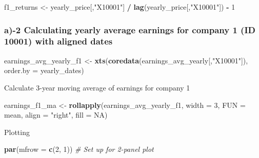 \documentclass[
]{article}
\newenvironment{Shaded}{\begin{snugshade}}{\end{snugshade}}
\newcommand{\AttributeTok}[1]{\textcolor[rgb]{0.13,0.29,0.53}{#1}}
\newcommand{\CommentTok}[1]{\textcolor[rgb]{0.56,0.35,0.01}{\textit{#1}}}
\newcommand{\ConstantTok}[1]{\textcolor[rgb]{0.56,0.35,0.01}{#1}}
\newcommand{\DecValTok}[1]{\textcolor[rgb]{0.00,0.00,0.81}{#1}}
\newcommand{\FunctionTok}[1]{\textcolor[rgb]{0.13,0.29,0.53}{\textbf{#1}}}
\newcommand{\NormalTok}[1]{#1}
\newcommand{\OtherTok}[1]{\textcolor[rgb]{0.56,0.35,0.01}{#1}}
\newcommand{\SpecialCharTok}[1]{\textcolor[rgb]{0.81,0.36,0.00}{\textbf{#1}}}
\newcommand{\StringTok}[1]{\textcolor[rgb]{0.31,0.60,0.02}{#1}}
\begin{document}
\begin{Shaded}
\begin{Highlighting}[]
\NormalTok{f1\_returns }\OtherTok{\textless{}{-}}\NormalTok{ yearly\_price[,}\StringTok{"X10001"}\NormalTok{] }\SpecialCharTok{/} \FunctionTok{lag}\NormalTok{(yearly\_price[,}\StringTok{"X10001"}\NormalTok{]) }\SpecialCharTok{{-}} \DecValTok{1}
\end{Highlighting}
\end{Shaded}

\subsubsection{a)-2 Calculating yearly average earnings for company 1
(ID 10001) with aligned
dates}\label{a-2-calculating-yearly-average-earnings-for-company-1-id-10001-with-aligned-dates}

\begin{Shaded}
\begin{Highlighting}[]
\NormalTok{earnings\_avg\_yearly\_f1 }\OtherTok{\textless{}{-}} \FunctionTok{xts}\NormalTok{(}\FunctionTok{coredata}\NormalTok{(earnings\_avg\_yearly[,}\StringTok{"X10001"}\NormalTok{]), }\AttributeTok{order.by =}\NormalTok{ yearly\_dates)}
\end{Highlighting}
\end{Shaded}

Calculate 3-year moving average of earnings for company 1

\begin{Shaded}
\begin{Highlighting}[]
\NormalTok{earnings\_f1\_ma }\OtherTok{\textless{}{-}} \FunctionTok{rollapply}\NormalTok{(earnings\_avg\_yearly\_f1, }\AttributeTok{width =} \DecValTok{3}\NormalTok{, }\AttributeTok{FUN =}\NormalTok{ mean, }\AttributeTok{align =} \StringTok{"right"}\NormalTok{, }\AttributeTok{fill =} \ConstantTok{NA}\NormalTok{)}
\end{Highlighting}
\end{Shaded}

Plotting

\begin{Shaded}
\begin{Highlighting}[]
\FunctionTok{par}\NormalTok{(}\AttributeTok{mfrow =} \FunctionTok{c}\NormalTok{(}\DecValTok{2}\NormalTok{, }\DecValTok{1}\NormalTok{))  }\CommentTok{\# Set up for 2{-}panel plot}
\end{Highlighting}
\end{Shaded}
\end{document}
